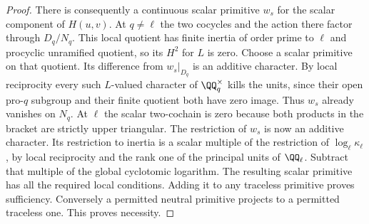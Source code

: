 \documentclass[a4paper,11pt]{article}
\theoremstyle{definition}
\theoremstyle{remark}
\numberwithin{equation}{section}
\begin{document}
\begin{proof}
There is consequently a continuous scalar primitive \(w_s\)
for the scalar component of \(H(u,v)\). At \(q\ne\ell\)
the two cocycles and the action there factor through
\(D_q/N_q\). This local quotient has finite inertia of
order prime to \(\ell\) and procyclic unramified quotient,
so its \(H^2\) for \(L\) is zero. Choose a scalar primitive
on that quotient. Its difference from \(w_s|_{D_q}\) is
an additive character. By local reciprocity every such
\(L\)-valued character of \(\QQ_q^\times\) kills the units,
since their open pro-\(q\) subgroup and their finite
quotient both have zero image. Thus \(w_s\) already
vanishes on \(N_q\). At \(\ell\) the scalar two-cochain
is zero because both products in the bracket are strictly
upper triangular. The restriction of \(w_s\) is now an
additive character. Its restriction to inertia is a scalar
multiple of the restriction of \(\log_\ell\kappa_\ell\),
by local reciprocity and the rank one of the principal
units of \(\QQ_\ell\). Subtract that multiple of the global
cyclotomic logarithm. The resulting scalar primitive has
all the required local conditions. Adding it to any
traceless primitive proves sufficiency. Conversely a
permitted neutral primitive projects to a permitted
traceless one. This proves necessity.
\end{proof}
\end{document}
